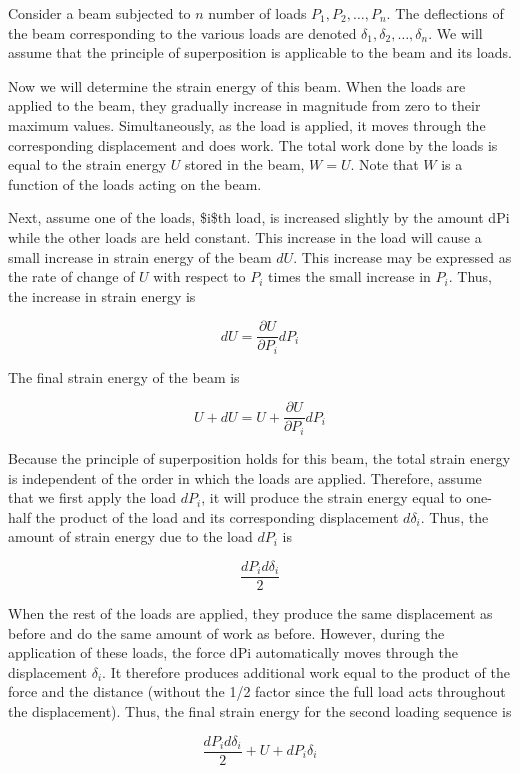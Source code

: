 \documentclass[a4paper,openany,12pt]{book}
\begin{document}
\begin{enumerate}
Consider a beam subjected to \(n\) number of loads
\(P_1, P_2, \ldots, P_n\). The deflections of the beam corresponding to
the various loads are denoted \(\delta_1, \delta_2, \ldots, \delta_n\). We
will assume that the principle of superposition is applicable to the
beam and its loads.

Now we will determine the strain energy of this beam. When the loads are
applied to the beam, they gradually increase in magnitude from zero to
their maximum values. Simultaneously, as the load is applied, it moves
through the corresponding displacement and does work. The total work
done by the loads is equal to the strain energy \(U\) stored in the beam,
\(W = U\). Note that \(W\) is a function of the loads acting on the beam.

Next, assume one of the loads, \$i\$th load, is increased slightly by the
amount dPi while the other loads are held constant. This increase in the
load will cause a small increase in strain energy of the beam \(dU\). This
increase may be expressed as the rate of change of \(U\) with respect to
\(P_i\) times the small increase in \(P_i\). Thus, the increase in strain
energy is

$$dU = \frac{{\partial U}}{{\partial {P_i}}}d{P_i}$$

The final strain energy of the beam is

$$U + dU = U + \frac{{\partial U}}{{\partial {P_i}}}d{P_i}$$

Because the principle of superposition holds for this beam, the total
strain energy is independent of the order in which the loads are
applied. Therefore, assume that we first apply the load \(dP_i\), it will
produce the strain energy equal to one-half the product of the load and
its corresponding displacement \(d\delta_i\). Thus, the amount of strain
energy due to the load \(dP_i\) is

$$\frac{dP_id\delta _i}{2}$$

When the rest of the loads are applied, they produce the same
displacement as before and do the same amount of work as before.
However, during the application of these loads, the force dPi
automatically moves through the displacement \(\delta_i\). It therefore
produces additional work equal to the product of the force and the
distance (without the 1/2 factor since the full load acts throughout the
displacement). Thus, the final strain energy for the second loading
sequence is

$$\frac{dP_id\delta _i}{2} + U + dP_i\delta _i$$


\end{enumerate}
\end{document}
